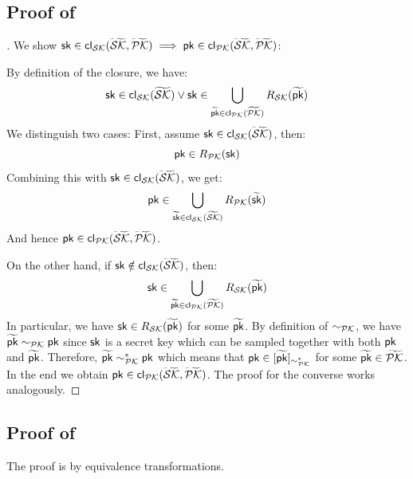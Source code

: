 \subsection{Proof of }
\label{sec:sk_iff_pk}

\skiffpk*

\begin{proof}[]
    We show $\sk \in \closure_\SK(\tildeSK, \tildePK) \implies \pk \in \closure_\PK(\tildeSK, \tildePK)$:

    By definition of the closure, we have:
    \[
    \sk \in \closure_\SK(\widetilde\SK) \lor \sk \in \bigcup_{\widetilde\pk \in \closure_\PK(\widetilde\PK)} R_\SK(\widetilde\pk)
    \]
    We distinguish two cases: First, assume $\sk \in \closure_\SK(\tildeSK)$, then:
    \[
        \pk \in R_\PK(\sk)
    \]
    Combining this with $\sk \in \closure_\SK(\tildeSK)$, we get:
    \[
        \pk \in \bigcup_{\widetilde\sk \in \closure_\SK(\tildeSK)} R_\PK(\widetilde\sk)
    \]
    And hence $\pk \in \closure_\PK(\tildeSK, \tildePK)$. 
    
    On the other hand, if $\sk \notin \closure_\SK(\tildeSK)$, then:
    \[
        \sk \in \bigcup_{\widetilde\pk \in \closure_\PK(\tildePK)} R_\SK(\widetilde\pk)
    \]
    In particular, we have $\sk \in R_\SK(\widetilde\pk)$ for some $\widetilde\pk$. By definition of $\sim_\PK$, we have
    $\widetilde\pk \sim_\PK \pk$ since $\sk$ is a secret key which can be sampled together with both $\pk$ and $\widetilde \pk$. Therefore, $\widetilde\pk \sim_\PK^* \pk$ which means that $\pk \in [\widetilde\pk]_{\sim_\PK^*}$
    for some $\widetilde\pk \in \tildePK$. In the end we obtain $\pk \in \closure_\PK(\tildeSK, \tildePK)$.
    The proof for the converse works analogously.
\end{proof}

\newpage

\subsection{Proof of }

\advrewritingone*

The proof is by equivalence transformations.

